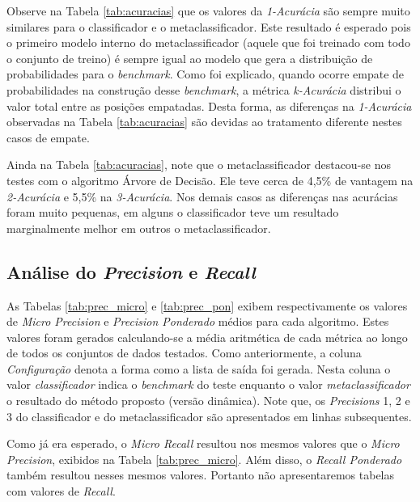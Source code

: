 Observe na Tabela \ref{tab:acuracias} que os valores da \textit{1-Acurácia} são sempre muito similares para o classificador e o metaclassificador.
Este resultado é esperado pois o primeiro modelo interno do metaclassificador (aquele que foi treinado com todo o conjunto de treino) é sempre igual ao modelo que gera a distribuição de probabilidades para o \textit{benchmark}.
Como foi explicado, quando ocorre empate de probabilidades na construção desse \textit{benchmark}, a métrica \textit{k-Acurácia} distribui o valor total entre as posições empatadas.
Desta forma, as diferenças na \textit{1-Acurácia} observadas na Tabela \ref{tab:acuracias} são devidas ao tratamento diferente nestes casos de empate.

Ainda na Tabela \ref{tab:acuracias}, note que o metaclassificador destacou-se nos testes com o algoritmo Árvore de Decisão.
Ele teve cerca de 4,5\% de vantagem na \textit{2-Acurácia} e 5,5\% na \textit{3-Acurácia}.
Nos demais casos as diferenças nas acurácias foram muito pequenas, em alguns o classificador teve um resultado marginalmente melhor em outros o metaclassificador.

\subsection{Análise do \textit{Precision} e \textit{Recall}}

As Tabelas \ref{tab:prec_micro} e \ref{tab:prec_pon} exibem respectivamente os valores de \textit{Micro Precision} e \textit{Precision Ponderado} médios para cada algoritmo.
Estes valores foram gerados calculando-se a média aritmética de cada métrica ao longo de todos os conjuntos de dados testados.
Como anteriormente, a coluna \textit{Configuração} denota a forma como a lista de saída foi gerada. 
Nesta coluna o valor \textit{classificador} indica o \textit{benchmark} do teste enquanto o valor \textit{metaclassificador} o resultado do método proposto (versão dinâmica).
Note que, os \textit{Precisions} 1, 2 e 3 do classificador e do metaclassificador são apresentados em linhas subsequentes.

Como já era esperado, o \textit{Micro Recall} resultou nos mesmos valores que o \textit{Micro Precision}, exibidos na Tabela \ref{tab:prec_micro}.
Além disso, o \textit{Recall Ponderado} também resultou nesses mesmos valores.
Portanto não apresentaremos tabelas com valores de \textit{Recall}.

